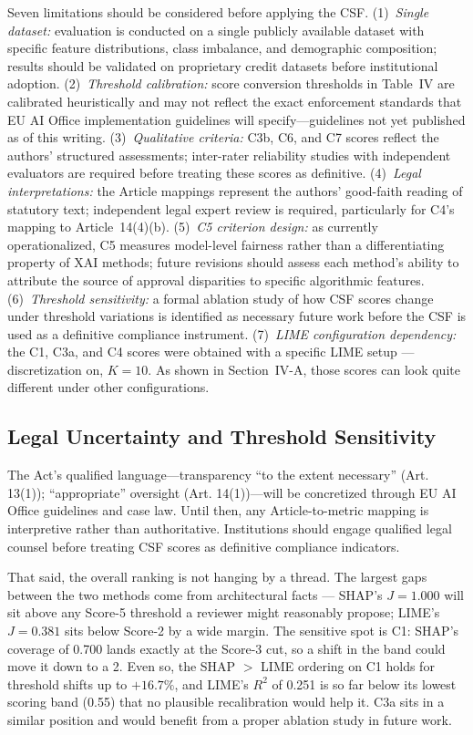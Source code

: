\documentclass[conference]{IEEEtran}
\begin{document}
Seven limitations should be considered before applying the CSF.
(1)~\textit{Single dataset:} evaluation is conducted on a single publicly
available dataset with specific feature distributions, class imbalance, and
demographic composition; results should be validated on proprietary credit
datasets before institutional adoption.
(2)~\textit{Threshold calibration:} score conversion thresholds in Table~IV
are calibrated heuristically and may not reflect the exact enforcement
standards that EU AI Office implementation guidelines will
specify---guidelines not yet published as of this writing.
(3)~\textit{Qualitative criteria:} C3b, C6, and C7 scores reflect the
authors' structured assessments; inter-rater reliability studies with
independent evaluators are required before treating these scores as
definitive.
(4)~\textit{Legal interpretations:} the Article mappings represent the
authors' good-faith reading of statutory text; independent legal expert
review is required, particularly for C4's mapping to Article~14(4)(b).
(5)~\textit{C5 criterion design:} as currently operationalized, C5 measures
model-level fairness rather than a differentiating property of XAI methods;
future revisions should assess each method's ability to attribute the source
of approval disparities to specific algorithmic features.
(6)~\textit{Threshold sensitivity:} a formal ablation study of how CSF
scores change under threshold variations is identified as necessary future
work before the CSF is used as a definitive compliance instrument.
(7)~\textit{LIME configuration dependency:} the C1, C3a, and C4 scores were obtained with a specific LIME setup --- discretization on, $K=10$. As shown in Section~IV-A, those scores can look quite different under other configurations.

\subsection{Legal Uncertainty and Threshold Sensitivity}

The Act's qualified language---transparency ``to the extent necessary'' (Art. 13(1)); ``appropriate'' oversight (Art. 14(1))---will be concretized through EU AI Office guidelines and case law. Until then, any Article-to-metric mapping is interpretive rather than authoritative. Institutions should engage qualified legal counsel before treating CSF scores as definitive compliance indicators.

That said, the overall ranking is not hanging by a thread. The largest gaps between the two methods come from architectural facts --- SHAP's $J = 1.000$ will sit above any Score-5 threshold a reviewer might reasonably propose; LIME's $J = 0.381$ sits below Score-2 by a wide margin. The sensitive spot is C1: SHAP's coverage of 0.700 lands exactly at the Score-3 cut, so a shift in the band could move it down to a 2. Even so, the SHAP $>$ LIME ordering on C1 holds for threshold shifts up to $+16.7\%$, and LIME's $R^2$ of 0.251 is so far below its lowest scoring band (0.55) that no plausible recalibration would help it. C3a sits in a similar position and would benefit from a proper ablation study in future work.
\end{document}
